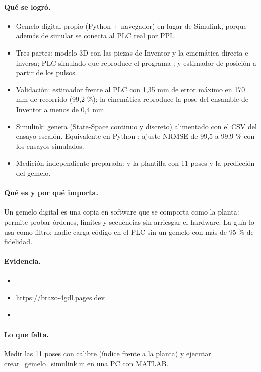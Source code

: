 \documentclass[a4paper,11pt]{article}
\begin{document}
\paragraph{Qué se logró.}
\begin{itemize}
\item Gemelo digital propio (Python + navegador) en lugar de Simulink, porque además de simular se conecta al PLC real por PPI.
\item Tres partes: modelo 3D con las piezas de Inventor y la cinemática directa e inversa; PLC simulado que reproduce el programa ; y estimador de posición a partir de los pulsos.
\item Validación: estimador frente al PLC con 1,35 mm de error máximo en 170 mm de recorrido (99,2 \%); la cinemática reproduce la pose del ensamble de Inventor a menos de 0,4 mm.
\item Simulink:  genera  (State-Space continuo y discreto) alimentado con el CSV del ensayo escalón. Equivalente en Python : ajuste NRMSE de 99,5 a 99,9 \% con los ensayos simulados.
\item Medición independiente preparada:  y la plantilla  con 11 poses y la predicción del gemelo.
\end{itemize}
\paragraph{Qué es y por qué importa.} Un gemelo digital es una copia en software que se comporta como la planta: permite probar órdenes, límites y secuencias sin arriesgar el hardware. La guía lo usa como filtro: nadie carga código en el PLC sin un gemelo con más de 95 \% de fidelidad.
\paragraph{Evidencia.}
\begin{itemize}\small
\item {}
\item \url{https://brazo-4gdl.pages.dev}
\item {}
\end{itemize}
\paragraph{Lo que falta.} Medir las 11 poses con calibre (índice frente a la planta) y ejecutar crear\_gemelo\_simulink.m en una PC con MATLAB.
\end{document}
